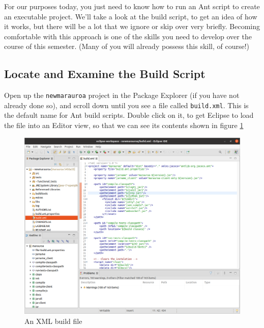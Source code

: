 \documentclass[
]{book}
\begin{document}
For our purposes today, you just need to know how to run an Ant script to create an executable project. We'll take a look at the build script, to get an idea of how it works, but there will be a lot that we ignore or skip over very briefly. Becoming comfortable with this approach is one of the skills you need to develop over the course of this semester. (Many of you will already possess this skill, of course!)

\hypertarget{locate-and-examine-the-build-script}{%
\subsection{Locate and Examine the Build Script}\label{locate-and-examine-the-build-script}}

Open up the \texttt{newmarauroa} project in the Package Explorer (if you have not already done so), and scroll down until you see a file called \texttt{build.xml}. This is the default name for Ant build scripts. Double click on it, to get Eclipse to load the file into an Editor view, so that we can see its contents shown in figure \ref{fig:buildfile-fig}

\begin{figure}

{\centering \includegraphics[width=1\linewidth]{images/2.1buildFile} 

}

\caption{An XML build file}\label{fig:buildfile-fig}
\end{figure}
\end{document}
